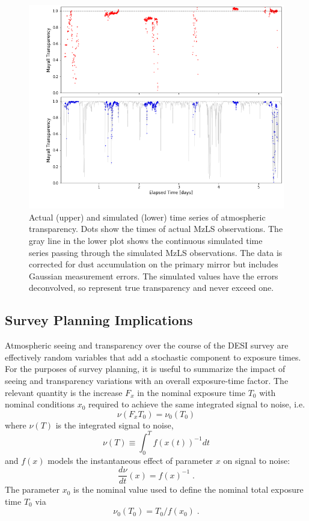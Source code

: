 \documentclass[12pt]{article}
\begin{document}
\begin{figure}[htb]
\begin{center}
\includegraphics[width=6in]{transp-sim}
\caption{Actual (upper) and simulated (lower) time series of atmospheric transparency. Dots show the times of actual MzLS observations. The gray line in the lower plot shows the continuous simulated time series passing through the simulated MzLS observations. The data is corrected for dust accumulation on the primary mirror but includes Gaussian measurement errors.  The simulated values have the errors deconvolved, so represent true transparency and never exceed one.}
\label{fig:transp-sim}
\end{center}
\end{figure}

\subsection{Survey Planning Implications}

Atmospheric seeing and transparency over the course of the DESI survey are effectively random variables that add a stochastic component to exposure times.  For the purposes of survey planning, it is useful to summarize the impact of seeing and transparency variations with an overall exposure-time factor.  The relevant quantity is the increase $F_x$ in the nominal exposure time $T_0$ with nominal conditions $x_0$ required to achieve the same integrated signal to noise, i.e.
$$
\nu(F_x T_0) = \nu_0(T_0)
$$
where $\nu(T)$ is the integrated signal to noise,
$$
\nu(T) \equiv \int_0^T f(x(t))^{-1} dt
$$
and $f(x)$ models the instantaneous effect of parameter $x$ on signal to noise:
$$
\frac{d\nu}{dt}(x) = f(x)^{-1} \; .
$$
The parameter $x_0$ is the nominal value used to define the nominal total exposure time $T_0$ via
$$
\nu_0(T_0) = T_0 / f(x_0) \; .
$$
\end{document}
